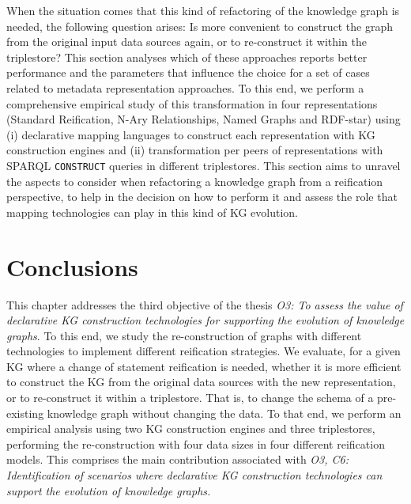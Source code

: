 When the situation comes that this kind of refactoring of the knowledge graph is needed, the following question arises: Is more convenient to construct the graph from the original input data sources again, or to re-construct it within the triplestore? This section analyses which of these approaches reports better performance and the parameters that influence the choice for a set of cases related to metadata representation approaches. 
To this end, we perform a comprehensive empirical study of this transformation in four representations (Standard Reification, N-Ary Relationships, Named Graphs and RDF-star) using (i) declarative mapping languages to construct each representation with KG construction engines and (ii) transformation per peers of representations with SPARQL \texttt{CONSTRUCT} queries in different triplestores. 
This section aims to unravel the aspects to consider when refactoring a knowledge graph from a reification perspective, to help in the decision on how to perform it and assess the role that mapping technologies can play in this kind of KG evolution. %



\section{Conclusions}

This chapter addresses the third objective of the thesis \textit{O3: To assess the value of declarative KG construction technologies for supporting the evolution of knowledge graphs}.
To this end, we study the re-construction of graphs with different technologies to implement different reification strategies. We evaluate, for a given KG where a change of statement reification is needed, whether it is more efficient to construct the KG from the original data sources with the new representation, or to re-construct it within a triplestore. 
That is, to change the schema of a pre-existing knowledge graph without changing the data. To that end, we perform an empirical analysis using two KG construction engines and three triplestores, performing the re-construction with four data sizes in four different reification models. 
This comprises the main contribution associated with \textit{O3, C6: Identification of scenarios where declarative KG construction technologies can support the evolution of knowledge graphs.}


